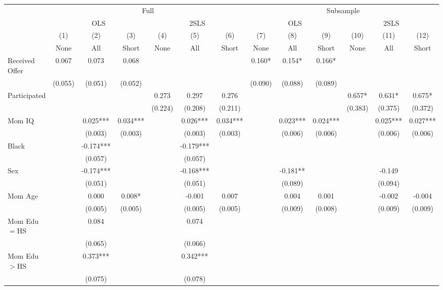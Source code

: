 \begin{tabular}{lcccccccccccc}
\toprule 
\midrule 
 & \multicolumn{6}{c}{Full} & \multicolumn{6}{c}{Subsample} \\
 \cmidrule(lr){2-7} \cmidrule(lr){8-13} 
 & \multicolumn{3}{c}{OLS} & \multicolumn{3}{c}{2SLS} & \multicolumn{3}{c}{OLS} & \multicolumn{3}{c}{2SLS} \\
 \cmidrule(lr){2-4} \cmidrule(lr){5-7} \cmidrule(lr){8-10} \cmidrule(lr){11-13} 
 & (1) & (2) & (3) & (4) & (5) & (6) & (7) & (8) & (9) & (10) & (11) & (12) \\
 & None & All & Short & None & All & Short & None & All & Short & None & All & Short \\
\midrule 
Received Offer & 0.067 & 0.073 & 0.068 &  &  &  & 0.160* & 0.154* & 0.166* &  &  &  \\
 & (0.055) & (0.051) & (0.052) &  &  &  & (0.090) & (0.088) & (0.089) &  &  &  \\
Participated &  &  &  & 0.273 & 0.297 & 0.276 &  &  &  & 0.657* & 0.631* & 0.675* \\
 &  &  &  & (0.224) & (0.208) & (0.211) &  &  &  & (0.383) & (0.375) & (0.372) \\
Mom IQ &  & 0.025*** & 0.034*** &  & 0.026*** & 0.034*** &  & 0.023*** & 0.024*** &  & 0.025*** & 0.027*** \\
 &  & (0.003) & (0.003) &  & (0.003) & (0.003) &  & (0.006) & (0.006) &  & (0.006) & (0.006) \\
Black &  & -0.174*** &  &  & -0.179*** &  &  &  &  &  &  &  \\
 &  & (0.057) &  &  & (0.057) &  &  &  &  &  &  &  \\
Sex &  & -0.174*** &  &  & -0.168*** &  &  & -0.181** &  &  & -0.149 &  \\
 &  & (0.051) &  &  & (0.051) &  &  & (0.089) &  &  & (0.094) &  \\
Mom Age &  & 0.000 & 0.008* &  & -0.001 & 0.007 &  & 0.004 & 0.001 &  & -0.002 & -0.004 \\
 &  & (0.005) & (0.005) &  & (0.005) & (0.005) &  & (0.009) & (0.008) &  & (0.009) & (0.009) \\
Mom Edu$=$HS &  & 0.084 &  &  & 0.074 &  &  &  &  &  &  &  \\
 &  & (0.065) &  &  & (0.066) &  &  &  &  &  &  &  \\
Mom Edu$>$HS &  & 0.373*** &  &  & 0.342*** &  &  &  &  &  &  &  \\
 &  & (0.075) &  &  & (0.078) &  &  &  &  &  &  &  \\

\end{tabular}

